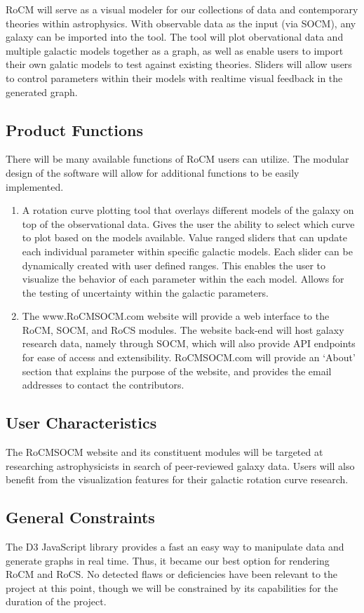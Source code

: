 \documentclass[titlepage]{article}
\begin{document}
RoCM will serve as a visual modeler for our collections of data and contemporary theories within astrophysics. With observable data as the input (via SOCM), any galaxy can be imported into the tool. The tool will plot obervational data and multiple galactic models together as a graph, as well as enable users to import their own galatic models to test against existing theories. Sliders will allow users to control parameters within their models with realtime visual feedback in the generated graph.

\subsection{Product Functions}
There will be many available functions of RoCM users can utilize. The modular design of the software will allow for additional functions to be easily implemented.
\begin{enumerate}
	\item A rotation curve plotting tool that overlays different models of the galaxy on top of the observational data. Gives the user the ability to select which curve to plot based on the models available. Value ranged sliders that can update each individual parameter within specific galactic models. Each slider can be dynamically created with user defined ranges. This enables the user to visualize the behavior of each parameter within the each model. Allows for the testing of uncertainty within the galactic parameters.
	\item The www.RoCMSOCM.com website will provide a web interface to the RoCM, SOCM, and RoCS modules. The website back-end will host galaxy research data, namely through SOCM, which will also provide API endpoints for ease of access and extensibility. RoCMSOCM.com will provide an `About' section that explains the purpose of the website, and provides the email addresses to contact the contributors.
\end{enumerate}


\subsection{User Characteristics}
The RoCMSOCM website and its constituent modules will be targeted at researching astrophysicists in search of peer-reviewed galaxy data. Users will also benefit from the visualization features for their galactic rotation curve research. 

\subsection{General Constraints}
\label{General Constraints}
The D3 JavaScript library provides a fast an easy way to manipulate data and generate graphs in real time. Thus, it became our best option for rendering RoCM and RoCS. No detected flaws or deficiencies have been relevant to the project at this point, though we will be constrained by its capabilities for the duration of the project.
\end{document}
